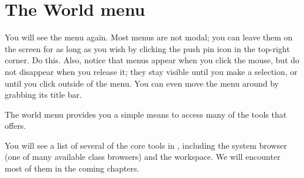 \documentclass[a4paper,10pt,twoside]{book}
\begin{document}
\section{The World menu}

You will see the  menu again.
Most \sq menus are not modal; you can leave them on the screen for as long as you wish by clicking the push pin icon in the top-right corner. Do this. Also, notice that menus appear when you click the mouse, but do not disappear when you release it; they stay visible until you make a selection, or until you click outside of the menu. You can even move the menu around by grabbing its title bar.

The world menu provides you a simple means to access many of the tools that \sq offers.

You will see a list of several of the core tools in \sq, including the system browser (one of many available class browsers) and the workspace.
We will encounter most of them in the coming chapters.

\end{document}
